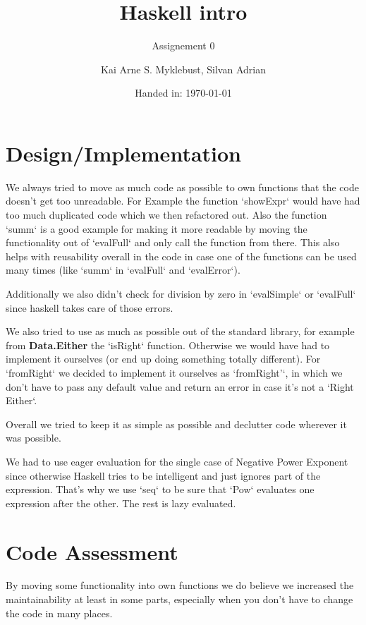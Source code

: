 \documentclass[12pt,a4paper]{article}
\begin{document}
\title{Haskell intro}
\subtitle{Assignement 0}

\author{Kai Arne S. Myklebust, Silvan Adrian}
\date{Handed in: \today}
	
\maketitle
\tableofcontents

\section{Design/Implementation}
We always tried to move as much code as possible to own functions that the code doesn't get too unreadable.
For Example the function `showExpr` would have had too much duplicated code which we then refactored out.
Also the function `summ` is a good example for making it more readable by moving the functionality out of `evalFull` and only call the function from there.
This also helps with reusability overall in the code in case one of the functions can be used many times (like `summ` in `evalFull` and `evalError`).

Additionally we also didn't check for division by zero in `evalSimple` or `evalFull` since haskell takes care of those errors.

We also tried to use as much as possible out of the standard library, for example from \textbf{Data.Either} the `isRight` function. Otherwise we would have had to implement it ourselves (or end up doing something totally different). For `fromRight` we decided to implement it ourselves as `fromRight'`, in which we don't have to pass any default value and return an error in case it's not a `Right Either`.

Overall we tried to keep it as simple as possible and declutter code wherever it was possible. \newline

We had to use eager evaluation for the single case of Negative Power Exponent since otherwise Haskell tries to be intelligent and just ignores part of the expression.
That's why we use `seq` to be sure that `Pow` evaluates one expression after the other.
The rest is lazy evaluated.



\section{Code Assessment}

By moving some functionality into own functions we do believe we increased the maintainability at least in some parts, especially when you don't have to change the code in many places.
\end{document}
